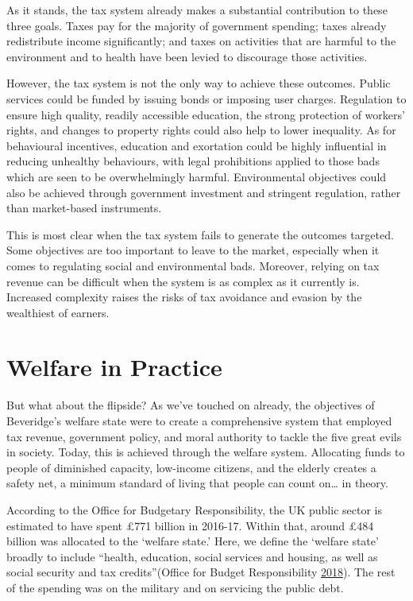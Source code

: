\documentclass[]{tufte-handout}
\begin{document}
As it stands, the tax system already makes a substantial contribution to
these three goals. Taxes pay for the majority of government spending;
taxes already redistribute income significantly; and taxes on activities
that are harmful to the environment and to health have been levied to
discourage those activities.

However, the tax system is not the only way to achieve these outcomes.
Public services could be funded by issuing bonds or imposing user
charges. Regulation to ensure high quality, readily accessible
education, the strong protection of workers' rights, and changes to
property rights could also help to lower inequality. As for behavioural
incentives, education and exortation could be highly influential in
reducing unhealthy behaviours, with legal prohibitions applied to those
bads which are seen to be overwhelmingly harmful. Environmental
objectives could also be achieved through government investment and
stringent regulation, rather than market-based instruments.

This is most clear when the tax system fails to generate the outcomes
targeted. Some objectives are too important to leave to the market,
especially when it comes to regulating social and environmental bads.
Moreover, relying on tax revenue can be difficult when the system is as
complex as it currently is. Increased complexity raises the risks of tax
avoidance and evasion by the wealthiest of earners.

\hypertarget{welfare-in-practice}{%
\section{Welfare in Practice}\label{welfare-in-practice}}

But what about the flipside? As we've touched on already, the objectives
of Beveridge's welfare state were to create a comprehensive system that
employed tax revenue, government policy, and moral authority to tackle
the five great evils in society. Today, this is achieved through the
welfare system. Allocating funds to people of diminished capacity,
low-income citizens, and the elderly creates a safety net, a minimum
standard of living that people can count on\ldots{} in theory.

According to the Office for Budgetary Responsibility, the UK public
sector is estimated to have spent £771 billion in 2016-17. Within that,
around £484 billion was allocated to the `welfare state.' Here, we
define the `welfare state' broadly to include ``health, education,
social services and housing, as well as social security and tax
credits''(Office for Budget Responsibility
\protect\hyperlink{ref-OBR2018}{2018}). The rest of the spending was on
the military and on servicing the public debt.
\end{document}
